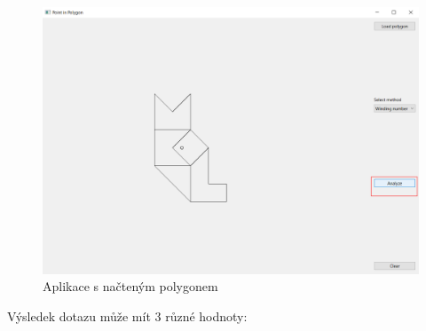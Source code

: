 \documentclass[11pt]{article}
\begin{document}
\begin{figure}[htbh]
	\centering
	\includegraphics[scale=0.4]{images/aplikace_klik_analyze.png} 
	\caption{Aplikace s načteným polygonem}
	\label{fig:app_analyze}
\end{figure} 

Výsledek dotazu může mít 3 různé hodnoty:
\end{document}
